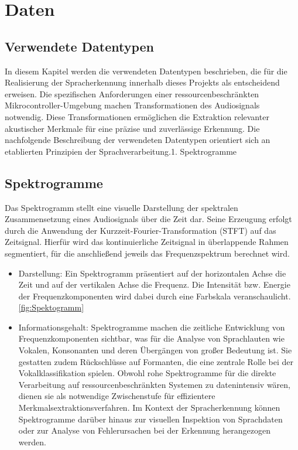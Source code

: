 %
%
%


\chapter{Daten} \label{sec:Daten}

\section{Verwendete Datentypen}

In diesem Kapitel werden die verwendeten Datentypen beschrieben, die für die Realisierung der Spracherkennung innerhalb dieses Projekts als entscheidend erweisen. Die spezifischen Anforderungen einer ressourcenbeschränkten Mikrocontroller-Umgebung machen Transformationen des Audiosignals notwendig. Diese Transformationen ermöglichen die Extraktion relevanter akustischer Merkmale für eine präzise und zuverlässige Erkennung. Die nachfolgende Beschreibung der verwendeten Datentypen orientiert sich an etablierten Prinzipien der Sprachverarbeitung.1. Spektrogramme \cite{Pfister:2008}

\section{Spektrogramme}

Das Spektrogramm stellt eine visuelle Darstellung der spektralen Zusammensetzung eines Audiosignals über die Zeit dar. Seine Erzeugung erfolgt durch die Anwendung der Kurzzeit-Fourier-Transformation (STFT) auf das Zeitsignal. Hierfür wird das kontinuierliche Zeitsignal in überlappende Rahmen segmentiert, für die anschließend jeweils das Frequenzspektrum berechnet wird.
\begin{itemize}
	\item Darstellung: Ein Spektrogramm präsentiert auf der horizontalen Achse die Zeit und auf der vertikalen Achse die Frequenz. Die Intensität bzw. Energie der Frequenzkomponenten wird dabei durch eine Farbskala veranschaulicht. \ref{fig:Spektogramm}
	
	\item Informationsgehalt: Spektrogramme machen die zeitliche Entwicklung von Frequenzkomponenten sichtbar, was für die Analyse von Sprachlauten wie Vokalen, Konsonanten und deren Übergängen von großer Bedeutung ist. Sie gestatten zudem Rückschlüsse auf Formanten, die eine zentrale Rolle bei der Vokalklassifikation spielen. Obwohl rohe Spektrogramme für die direkte Verarbeitung auf ressourcenbeschränkten Systemen zu datenintensiv wären, dienen sie als notwendige Zwischenstufe für effizientere Merkmalsextraktionsverfahren. Im Kontext der Spracherkennung können Spektrogramme darüber hinaus zur visuellen Inspektion von Sprachdaten oder zur Analyse von Fehlerursachen bei der Erkennung herangezogen werden.
\end{itemize} \cite{Pfister:2008}

